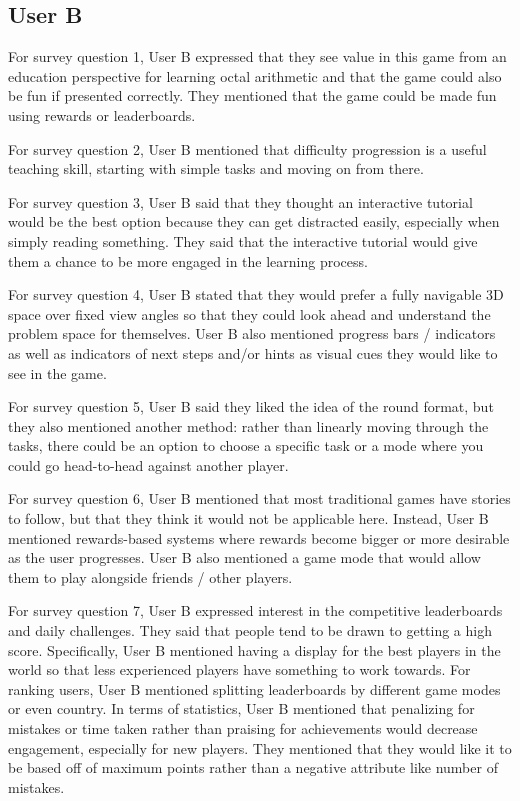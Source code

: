 \documentclass{article}
\begin{document}
\subsection{User B}

For survey question 1, User B expressed that they see value in this game from an education perspective for learning octal arithmetic and that the game could also be fun if presented correctly. They mentioned that the game could be made fun using rewards or leaderboards.

For survey question 2, User B mentioned that difficulty progression is a useful teaching skill, starting with simple tasks and moving on from there.

For survey question 3, User B said that they thought an interactive tutorial would be the best option because they can get distracted easily, especially when simply reading something. They said that the interactive tutorial would give them a chance to be more engaged in the learning process.

For survey question 4, User B stated that they would prefer a fully navigable 3D space over fixed view angles so that they could look ahead and understand the problem space for themselves. User B also mentioned progress bars / indicators as well as indicators of next steps and/or hints as visual cues they would like to see in the game.

For survey question 5, User B said they liked the idea of the round format, but they also mentioned another method: rather than linearly moving through the tasks, there could be an option to choose a specific task or a mode where you could go head-to-head against another player.

For survey question 6, User B mentioned that most traditional games have stories to follow, but that they think it would not be applicable here. Instead, User B mentioned rewards-based systems where rewards become bigger or more desirable as the user progresses. User B also mentioned a game mode that would allow them to play alongside friends / other players.

For survey question 7, User B expressed interest in the competitive leaderboards and daily challenges. They said that people tend to be drawn to getting a high score. Specifically, User B mentioned having a display for the best players in the world so that less experienced players have something to work towards. For ranking users, User B mentioned splitting leaderboards by different game modes or even country. In terms of statistics, User B mentioned that penalizing for mistakes or time taken rather than praising for achievements would decrease engagement, especially for new players. They mentioned that they would like it to be based off of maximum points rather than a negative attribute like number of mistakes.
\end{document}
